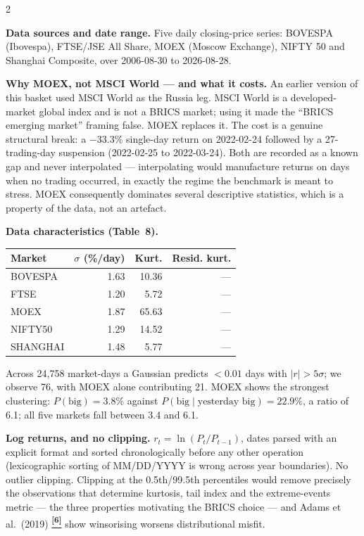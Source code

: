 \documentclass[10pt]{article}
\newcommand{\tcite}[1]{%
  \hyperlink{R:#1}{\textsuperscript{\scriptsize\textbf{[#1]}}}}
\begin{document}
\begin{multicols}{2}
\small

\textbf{Data sources and date range.}
Five daily closing-price series: BOVESPA (Ibovespa), FTSE/JSE All Share, MOEX (Moscow Exchange), NIFTY 50 and Shanghai Composite, over 2006-08-30 to 2026-08-28.

\smallskip
\textbf{Why MOEX, not MSCI World --- and what it costs.}
An earlier version of this basket used MSCI World as the Russia leg. MSCI World is a developed-market global index and is not a BRICS market; using it made the ``BRICS emerging market'' framing false. MOEX replaces it. The cost is a genuine structural break: a $-33.3\%$ single-day return on 2022-02-24 followed by a 27-trading-day suspension (2022-02-25 to 2022-03-24). Both are recorded as a known gap and never interpolated --- interpolating would manufacture returns on days when no trading occurred, in exactly the regime the benchmark is meant to stress. MOEX consequently dominates several descriptive statistics, which is a property of the data, not an artefact.

\smallskip
\textbf{Data characteristics (Table~8).}

\begin{tabular}{@{}lrrr@{}}
\toprule
Market & $\sigma$ (\%/day) & Kurt. & Resid. kurt. \\
\midrule
BOVESPA & 1.63 & 10.36 & --- \\
FTSE & 1.20 & 5.72 & --- \\
MOEX & 1.87 & 65.63 & --- \\
NIFTY50 & 1.29 & 14.52 & --- \\
SHANGHAI & 1.48 & 5.77 & --- \\
\bottomrule
\end{tabular}

\smallskip
Across 24,758 market-days a Gaussian predicts $<0.01$ days with $|r|>5\sigma$; we observe 76, with MOEX alone contributing 21. MOEX shows the strongest clustering: $P(\text{big})=3.8\%$ against $P(\text{big}\mid\text{yesterday big})=22.9\%$, a ratio of 6.1; all five markets fall between 3.4 and 6.1.

\smallskip
\textbf{Log returns, and no clipping.}
$r_t = \ln(P_t/P_{t-1})$, dates parsed with an explicit format and sorted chronologically before any other operation (lexicographic sorting of MM/DD/YYYY is wrong across year boundaries). No outlier clipping. Clipping at the 0.5th/99.5th percentiles would remove precisely the observations that determine kurtosis, tail index and the extreme-events metric --- the three properties motivating the BRICS choice --- and Adams et al.\ (2019)\tcite{6} show winsorising worsens distributional misfit.


\end{multicols}
\end{document}
